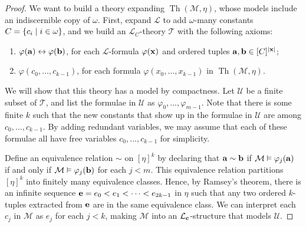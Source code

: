 \begin{proof}
	We want to build a theory expanding \( \operatorname{Th}(\mathcal M, \eta) \), whose models include an indiscernible copy of \( \omega \).
	First, expand \( \mathcal L \) to add \( \omega \)-many constants \( C = \qty{c_i \mid i \in \omega} \), and we build an \( \mathcal L_C \)-theory \( \mathcal T \) with the following axioms:
	\begin{enumerate}
		\item \( \varphi(\vb a) \leftrightarrow \varphi(\vb b) \), for each \( \mathcal L \)-formula \( \varphi(\vb x) \) and ordered tuples \( \vb a, \vb b \in [C]^{\abs{\vb x}} \);
		\item \( \varphi(c_0, \dots, c_{k-1}) \), for each formula \( \varphi(x_0, \dots, x_{k-1}) \) in \( \operatorname{Th}(\mathcal M, \eta) \).
	\end{enumerate}
	We will show that this theory has a model by compactness.
	Let \( \mathcal U \) be a finite subset of \( \mathcal T \), and list the formulae in \( \mathcal U \) as \( \varphi_0, \dots, \varphi_{m-1} \).
	Note that there is some finite \( k \) such that the new constants that show up in the formulae in \( \mathcal U \) are among \( c_0, \dots, c_{k-1} \).
	By adding redundant variables, we may assume that each of these formulae all have free variables \( c_0, \dots, c_{k-1} \) for simplicity.

	Define an equivalence relation \( \sim \) on \( [\eta]^k \) by declaring that \( \vb a \sim \vb b \) if \( \mathcal M \vDash \varphi_j(\vb a) \) if and only if \( \mathcal M \vDash \varphi_j(\vb b) \) for each \( j < m \).
	This equivalence relation partitions \( [\eta]^k \) into finitely many equivalence classes.
	Hence, by Ramsey's theorem, there is an infinite sequence \( \vb e = e_0 < e_1 < \dots < e_{2k-1} \) in \( \eta \) such that any two ordered \( k \)-tuples extracted from \( \vb e \) are in the same equivalence class.
	We can interpret each \( c_j \) in \( \mathcal M \) as \( e_j \) for each \( j < k \), making \( \mathcal M \) into an \( \mathcal L_{\vb c} \)-structure that models \( \mathcal U \).


\end{proof}
